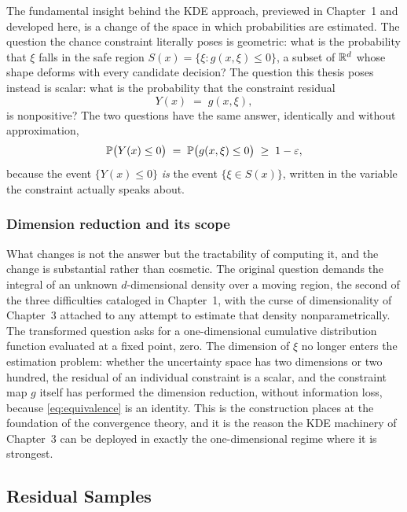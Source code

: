 The fundamental insight behind the KDE approach, previewed in Chapter~1
and developed here, is a change of the space in which
probabilities are estimated. The question the chance constraint
literally poses is geometric: what is the probability that $\xi$ falls
in the safe region $S(x) = \{\xi : g(x,\xi) \leq 0\}$, a subset of
$\mathbb{R}^d$ whose shape deforms with every candidate decision? The question
this thesis poses instead is scalar: what is the probability that the
constraint residual
\begin{equation}
  Y(x) \;=\; g(x,\xi) ,
  \label{eq:residual}
\end{equation}
is nonpositive? The two questions have the same answer, identically and
without approximation,
\begin{equation}
  \mathbb{P}\bigl(Y(x) \leq 0\bigr)
  \;=\; \mathbb{P}\bigl(g(x,\xi) \leq 0\bigr)
  \;\geq\; 1-\varepsilon ,
  \label{eq:equivalence}
\end{equation}
because the event $\{Y(x) \leq 0\}$ \emph{is} the event
$\{\xi \in S(x)\}$, written in the variable the constraint actually
speaks about.

\subsubsection{Dimension reduction and its scope}
\label{sec:residualdimension}

What changes is not the answer but the tractability of computing it,
and the change is substantial rather than cosmetic. The original question demands
the integral of an unknown $d$-dimensional density over a moving region,
the second of the three difficulties cataloged in Chapter~1, with the
curse of dimensionality of Chapter~3 attached to any attempt to estimate
that density nonparametrically. The transformed question asks for a
one-dimensional cumulative distribution function evaluated at a fixed
point, zero. The dimension of $\xi$ no longer enters the estimation
problem: whether the uncertainty space has two dimensions or two
hundred, the residual of an individual constraint is a scalar, and the
constraint map $g$ itself has performed the dimension reduction, without
information loss, because \cref{eq:equivalence} is an identity. This is
the construction \citet{schuster2025} places at the foundation of the
convergence theory, and it is the reason the KDE machinery of Chapter~3
can be deployed in exactly the one-dimensional regime where it is
strongest.

\subsection{Residual Samples}
\label{sec:residualsamples}

